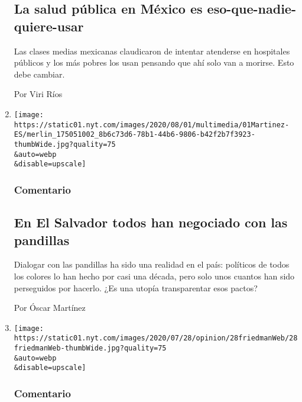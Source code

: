 \begin{enumerate}
  \hypertarget{la-salud-puxfablica-en-muxe9xico-es-eso-que-nadie-quiere-usar}{%
  \subsection{La salud pública en México es
  eso-que-nadie-quiere-usar}\label{la-salud-puxfablica-en-muxe9xico-es-eso-que-nadie-quiere-usar}}

  Las clases medias mexicanas claudicaron de intentar atenderse en
  hospitales públicos y los más pobres los usan pensando que ahí solo
  van a morirse. Esto debe cambiar.

  Por Viri Ríos
\item
  \href{/es/2020/08/02/espanol/opinion/pandillas-el-salvador.html}{}

  \texttt{[image: https://static01.nyt.com/images/2020/08/01/multimedia/01Martinez-ES/merlin\_175051002\_8b6c73d6-78b1-44b6-9806-b42f2b7f3923-thumbWide.jpg?quality=75\\\&auto=webp\\\&disable=upscale]}

  \hypertarget{comentario-6}{%
  \subsubsection{Comentario}\label{comentario-6}}

  \hypertarget{en-el-salvador-todos-han-negociado-con-las-pandillas}{%
  \subsection{En El Salvador todos han negociado con las
  pandillas}\label{en-el-salvador-todos-han-negociado-con-las-pandillas}}

  Dialogar con las pandillas ha sido una realidad en el país: políticos
  de todos los colores lo han hecho por casi una década, pero solo unos
  cuantos han sido perseguidos por hacerlo. ¿Es una utopía transparentar
  esos pactos?

  Por Óscar Martínez
\item
  \href{/es/2020/07/30/espanol/opinion/usar-cubrebocas-politica.html}{}

  \texttt{[image: https://static01.nyt.com/images/2020/07/28/opinion/28friedmanWeb/28friedmanWeb-thumbWide.jpg?quality=75\\\&auto=webp\\\&disable=upscale]}

  \hypertarget{comentario-7}{%
  \subsubsection{Comentario}\label{comentario-7}}


\end{enumerate}
